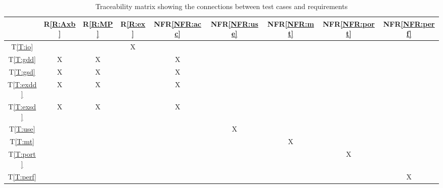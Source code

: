 \documentclass[12pt, titlepage]{article}
\newcommand{\tref}[1]{T\ref{#1}}
\newcommand{\rref}[1]{R\ref{#1}}
\newcommand{\nfrref}[1]{NFR\ref{#1}}
\begin{document}

\begin{table}[H]
  \centering
  \begin{tabular}{|c|c|c|c|c|c|c|c|c|}                                      \hline
                  & \rref{R:Axb} & \rref{R:MP} & \rref{R:ex} & \nfrref{NFR:acc} & \nfrref{NFR:use} & \nfrref{NFR:mt} & \nfrref{NFR:port} & \nfrref{NFR:perf} \\ \hline
    \tref{T:io}   &              &             & X           &                  &                  &                 &                   &                   \\ \hline
    \tref{T:gdd}  & X            & X           &             & X                &                  &                 &                   &                   \\ \hline
    \tref{T:gsd}  & X            & X           &             & X                &                  &                 &                   &                   \\ \hline
    \tref{T:exdd} & X            & X           &             & X                &                  &                 &                   &                   \\ \hline
    \tref{T:exsd} & X            & X           &             & X                &                  &                 &                   &                   \\ \hline
    \tref{T:use}  &              &             &             &                  & X                &                 &                   &                   \\ \hline
    \tref{T:mt}   &              &             &             &                  &                  & X               &                   &                   \\ \hline
    \tref{T:port} &              &             &             &                  &                  &                 & X                 &                   \\ \hline
    \tref{T:perf} &              &             &             &                  &                  &                 &                   & X                 \\ \hline
  \end{tabular}
  \caption{Traceability matrix showing the connections between test cases and
    requirements}
  \label{Table:T_trace}
\end{table}
\end{document}
